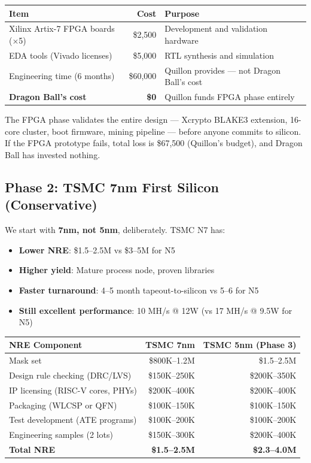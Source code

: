 \documentclass[11pt,a4paper]{article}
\begin{document}
\begin{center}
\begin{tabular}{@{}lrp{8cm}@{}}
\toprule
\textbf{Item} & \textbf{Cost} & \textbf{Purpose} \\
\midrule
Xilinx Artix-7 FPGA boards ($\times$5) & \$2{,}500 & Development and validation hardware \\
EDA tools (Vivado licenses) & \$5{,}000 & RTL synthesis and simulation \\
Engineering time (6 months) & \$60{,}000 & Quillon provides --- not Dragon Ball's cost \\
\midrule
\textbf{Dragon Ball's cost} & \textbf{\$0} & Quillon funds FPGA phase entirely \\
\bottomrule
\end{tabular}
\end{center}

The FPGA phase validates the entire design --- Xcrypto BLAKE3 extension, 16-core cluster, boot firmware, mining pipeline --- before anyone commits to silicon. If the FPGA prototype fails, total loss is \$67,500 (Quillon's budget), and Dragon Ball has invested nothing.

\subsection{Phase 2: TSMC 7nm First Silicon (Conservative)}

We start with \textbf{7nm, not 5nm}, deliberately. TSMC N7 has:
\begin{itemize}[leftmargin=1.5em]
    \item \textbf{Lower NRE}: \$1.5--2.5M vs \$3--5M for N5
    \item \textbf{Higher yield}: Mature process node, proven libraries
    \item \textbf{Faster turnaround}: 4--5 month tapeout-to-silicon vs 5--6 for N5
    \item \textbf{Still excellent performance}: 10 MH/s @ 12W (vs 17 MH/s @ 9.5W for N5)
\end{itemize}

\begin{center}
\begin{tabular}{@{}lrr@{}}
\toprule
\textbf{NRE Component} & \textbf{TSMC 7nm} & \textbf{TSMC 5nm (Phase 3)} \\
\midrule
Mask set & \$800K--1.2M & \$1.5--2.5M \\
Design rule checking (DRC/LVS) & \$150K--250K & \$200K--350K \\
IP licensing (RISC-V cores, PHYs) & \$200K--400K & \$200K--400K \\
Packaging (WLCSP or QFN) & \$100K--150K & \$100K--150K \\
Test development (ATE programs) & \$100K--200K & \$100K--200K \\
Engineering samples (2 lots) & \$150K--300K & \$200K--400K \\
\midrule
\textbf{Total NRE} & \textbf{\$1.5--2.5M} & \textbf{\$2.3--4.0M} \\
\bottomrule
\end{tabular}
\end{center}
\end{document}

